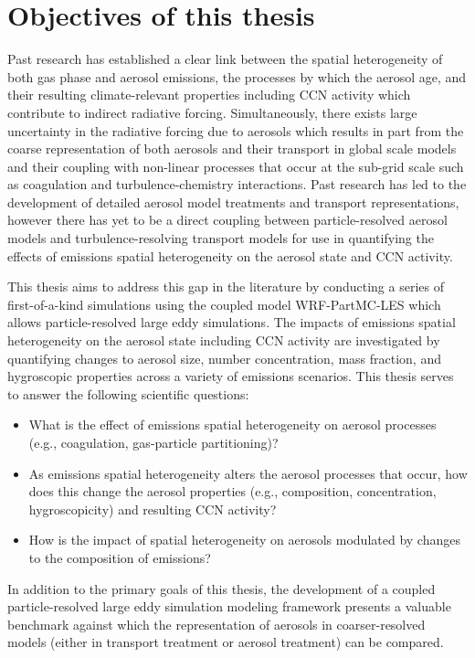 \section{Objectives of this thesis}

Past research has established a clear link between the spatial heterogeneity of both gas phase and aerosol emissions, the processes by which the aerosol age, and their resulting climate-relevant properties including CCN activity which contribute to indirect radiative forcing. Simultaneously, there exists large uncertainty in the radiative forcing due to aerosols which results in part from the coarse representation of both aerosols and their transport in global scale models and their coupling with non-linear processes that occur at the sub-grid scale such as coagulation and turbulence-chemistry interactions. Past research has led to the development of detailed aerosol model treatments and transport representations, however there has yet to be a direct coupling between particle-resolved aerosol models and turbulence-resolving transport models for use in quantifying the effects of emissions spatial heterogeneity on the aerosol state and CCN activity. 

This thesis aims to address this gap in the literature by conducting a series of first-of-a-kind simulations using the coupled model WRF-PartMC-LES which allows particle-resolved large eddy simulations. The impacts of emissions spatial heterogeneity on the aerosol state including CCN activity are investigated by quantifying changes to aerosol size, number concentration, mass fraction, and hygroscopic properties across a variety of emissions scenarios. This thesis serves to answer the following scientific questions:
\begin{itemize}
\item What is the effect of emissions spatial heterogeneity on aerosol processes (e.g., coagulation, gas-particle partitioning)?
\item As emissions spatial heterogeneity alters the aerosol processes that occur, how does this change the aerosol properties (e.g., composition, concentration, hygroscopicity) and resulting CCN activity? 
\item How is the impact of spatial heterogeneity on aerosols modulated by changes to the composition of emissions?
\end{itemize}

In addition to the primary goals of this thesis, the development of a coupled particle-resolved large eddy simulation modeling framework presents a valuable benchmark against which the representation of aerosols in coarser-resolved models (either in transport treatment or aerosol treatment) can be compared.

